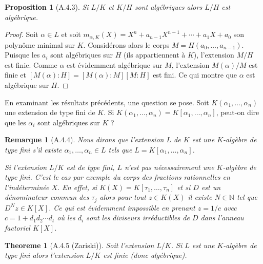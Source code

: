 \documentclass[12pts,a4paper]{report}
\newtheorem{proposition}{Proposition}
\newtheorem{remarque}{Remarque}
\newtheorem{theoreme}{Theoreme}
\begin{document}
\begin{proposition}[A.4.3]
Si \( L/K \) et \( K/H \) sont algébriques alors \( L/H \) est algébrique.
\end{proposition}

\begin{proof}
Soit \( \alpha \in L \) et soit \( m_{\alpha,K}(X) = X^n + a_{n-1}X^{n-1} + \cdots + a_1X + a_0 \) son polynôme minimal sur \( K \). Considérons alors le corps \( M = H(a_0, \ldots, a_{n-1}) \). Puisque les \( a_i \) sont algébriques sur \( H \) (ils appartiennent à \( K \)), l'extension \( M/H \) est finie. Comme \( \alpha \) est évidemment algébrique sur \( M \), l'extension \( M(\alpha)/M \) est finie et \( [M(\alpha) : H] = [M(\alpha) : M][M : H] \) est fini. Ce qui montre que \( \alpha \) est algébrique sur \( H \). \qedhere
\end{proof}

En examinant les résultats précédents, une question se pose. Soit \( K(\alpha_1, \ldots, \alpha_n) \) une extension de type fini de \( K \). Si \( K(\alpha_1, \ldots, \alpha_n) = K[\alpha_1, \ldots, \alpha_n] \), peut-on dire que les \( \alpha_i \) sont algébriques sur \( K \) ?

\begin{remarque}[A.4.4]
Nous dirons que l'extension \( L \) de \( K \) est une \( K \)-algèbre de type fini s'il existe \( \alpha_1, \ldots, \alpha_n \in L \) tels que \( L = K[\alpha_1, \ldots, \alpha_n] \).

Si l'extension \( L/K \) est de type fini, \( L \) n'est pas nécessairement une \( K \)-algèbre de type fini. C'est le cas par exemple du corps des fractions rationnelles en l'indéterminée \( X \). En effet, si \( K(X) = K[\tau_1, \ldots, \tau_n] \) et si \( D \) est un dénominateur commun des \( \tau_j \) alors pour tout \( z \in K(X) \) il existe \( N \in \mathbb{N} \) tel que \( D^N z \in K[X] \). Ce qui est évidemment impossible en prenant \( z = 1/c \) avec \( c = 1 + d_1d_2 \cdots d_t \) où les \( d_i \) sont les diviseurs irréductibles de \( D \) dans l'anneau factoriel \( K[X] \).
\end{remarque}

\begin{theoreme}[A.4.5 (Zariski)]
Soit l'extension \( L/K \). Si \( L \) est une \( K \)-algèbre de type fini alors l'extension \( L/K \) est finie (donc algébrique).
\end{theoreme}
\end{document}

